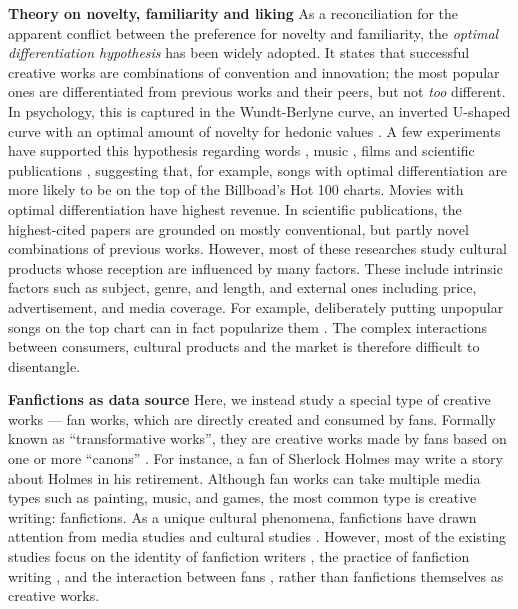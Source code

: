 \documentclass[letterpaper]{article} %
\begin{document}
\textbf{Theory on novelty, familiarity and liking}    As a reconciliation for the apparent conflict between the preference for novelty and familiarity, the \emph{optimal differentiation hypothesis} \cite{thompson2017hit} has been widely adopted. It states that successful creative works are combinations of convention and innovation; the most popular ones are differentiated from previous works and their peers, but not \emph{too} different. In psychology, this is captured in the Wundt-Berlyne curve, an inverted U-shaped curve with an optimal amount of novelty for hedonic values \cite{berlyne1970novelty}. A few experiments have supported this hypothesis regarding words \cite{sluckin1980liking}, music \cite{hargreaves1984effects}  \cite{askin2017makes},  films \cite{sreenivasan2013quantitative} and scientific publications \cite{uzzi2013atypical}, suggesting that, for example, songs with optimal differentiation are more likely to be on the top of the Billboad's Hot 100 charts. Movies with optimal differentiation have highest revenue. In scientific publications, the highest-cited papers are grounded on mostly conventional, but partly novel combinations of previous works. However, most of these researches study cultural products whose reception are influenced by many factors. These include intrinsic factors such as subject, genre, and length, and external ones including price, advertisement, and media coverage. For example, deliberately putting unpopular songs on the top chart can in fact popularize them \cite{salganik2008leading}. The complex interactions between consumers, cultural products and the market is therefore difficult to disentangle. 
 
\textbf{Fanfictions as data source}   Here, we instead study a special type of creative works --- fan works, which are directly created and consumed by fans. Formally known as ``transformative works'', they are creative works made by fans based on one or more ``canons'' \cite{wiki:transf_work}. For instance, a fan of Sherlock Holmes may write a story about Holmes in his retirement. Although fan works can take multiple media types such as painting, music, and games, the most common type is creative writing: fanfictions.  As a unique cultural phenomena, fanfictions have drawn attention from media studies and cultural studies \cite{thomas2011fanfiction}. However, most of the existing studies focus on the identity of fanfiction writers \cite{black2006language}, the practice of fanfiction writing \cite{LIT:LIT12061}, and the interaction between fans \cite{hills2015expertise}, rather than fanfictions themselves as creative works.
\end{document}
